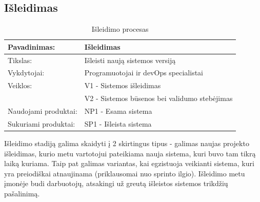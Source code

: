\documentclass{VUMIFPSkursinis}
\begin{document}
	\subsection{Išleidimas}
	\begin{center}
		\begin{table}[ht]
		\caption{Išleidimo procesas}
		\begin{tabular}{ | l | l | } 
		\hline
		Pavadinimas:         & Išleidimas                             \\ \hline
		Tikslas: 	           & Išleisti naują sistemos versiją\\ \hline
		Vykdytojai:          & Programuotojai ir devOps specialistai                                \\ \hline
		Veiklos:             & V1 - Sistemos išleidimas 													\\ 
						             & V2 - Sistemos būsenos bei validumo stebėjimas \\ \hline
		Naudojami produktai: & NP1 - Esama sistema\\ \hline
		Sukuriami produktai: & SP1 - Išleista sistema																											\\ \hline
		\end{tabular}
	\end{table}
		\end{center}
	Išleidimo stadiją galima skaidyti į 2 skirtingus tipus - galimas naujas projekto išleidimas, kurio metu vartotojui pateikiama nauja sistema, kuri buvo tam tikrą laiką kuriama. Taip pat galimas variantas, kai egzistuoja veikianti sistema, kuri yra preiodiškai atnaujinama (priklausomai nuo sprinto ilgio). Išleidimo metu įmonėje budi darbuotojų, atsakingi už greutą išleistos sistemos trikdžių pašalinimą.
\end{document}

